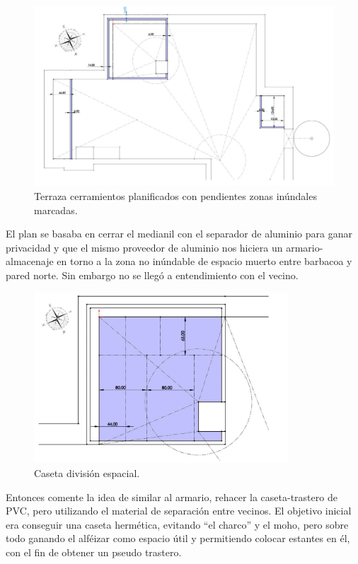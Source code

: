 \begin{figure}[!htb]
\begin{center}
\includegraphics[width=1\textwidth]{./figuras/cerramiento.jpg}
\caption{Terraza cerramientos planificados  con pendientes zonas inúndales marcadas.}
\label{F:cerramiento}
\end{center}
\end{figure}

El plan se basaba en cerrar el medianil con el separador de aluminio para ganar privacidad y que el mismo proveedor de aluminio nos hiciera un armario-almacenaje en torno a la zona no inúndable de espacio muerto entre barbacoa y pared norte. Sin embargo no se llegó a entendimiento con el vecino. 

\begin{figure}[!htb]
\begin{center}
\includegraphics[width=0.85\textwidth]{./figuras/caseta_division_spacio.jpg}
\caption{Caseta división espacial.}
\label{F:caseta_division_spacio}
\end{center}
\end{figure}
Entonces comente la idea de similar al armario, rehacer la caseta-trastero de PVC, pero utilizando el material de separación entre vecinos. El objetivo inicial era conseguir una caseta hermética, evitando “el charco” y el moho, pero sobre todo ganando el alféizar como espacio útil y permitiendo colocar estantes en él, con el fin de obtener un pseudo trastero.

